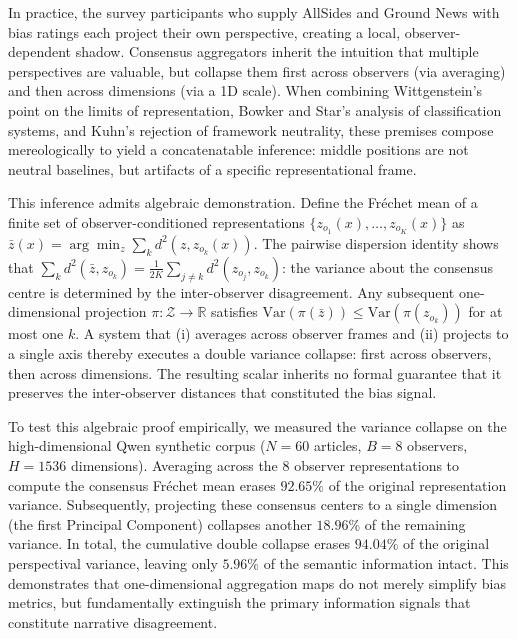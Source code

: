 In practice, the survey participants who supply AllSides and Ground News with bias ratings each project their own perspective, creating a local, observer-dependent shadow. Consensus aggregators inherit the intuition that multiple perspectives are valuable, but collapse them first across observers (via averaging) and then across dimensions (via a 1D scale). When combining Wittgenstein's \citeyearpar{wittgenstein1922} point on the limits of representation, Bowker and Star's \citeyearpar{bowkerstar1999} analysis of classification systems, and Kuhn's \citeyearpar{kuhn1962} rejection of framework neutrality, these premises compose mereologically to yield a concatenatable inference: middle positions are not neutral baselines, but artifacts of a specific representational frame.

This inference admits algebraic demonstration. Define the Fréchet mean of a finite set of observer-conditioned representations $\{z_{o_1}(x), \ldots, z_{o_K}(x)\}$ as $\bar{z}(x) = \arg\min_z \sum_{k} d^2(z, z_{o_k}(x))$. The pairwise dispersion identity shows that $\sum_k d^2(\bar{z}, z_{o_k}) = \frac{1}{2K}\sum_{j \neq k} d^2(z_{o_j}, z_{o_k})$: the variance about the consensus centre is determined by the inter-observer disagreement. Any subsequent one-dimensional projection $\pi\colon \mathcal{Z} \to \mathbb{R}$ satisfies $\mathrm{Var}(\pi(\bar{z})) \leq \mathrm{Var}(\pi(z_{o_k}))$ for at most one $k$. A system that (i) averages across observer frames and (ii) projects to a single axis thereby executes a double variance collapse: first across observers, then across dimensions. The resulting scalar inherits no formal guarantee that it preserves the inter-observer distances that constituted the bias signal.

To test this algebraic proof empirically, we measured the variance collapse on the high-dimensional Qwen synthetic corpus ($N=60$ articles, $B=8$ observers, $H=1536$ dimensions). Averaging across the 8 observer representations to compute the consensus Fréchet mean erases $92.65\%$ of the original representation variance. Subsequently, projecting these consensus centers to a single dimension (the first Principal Component) collapses another $18.96\%$ of the remaining variance. In total, the cumulative double collapse erases $94.04\%$ of the original perspectival variance, leaving only $5.96\%$ of the semantic information intact. This demonstrates that one-dimensional aggregation maps do not merely simplify bias metrics, but fundamentally extinguish the primary information signals that constitute narrative disagreement.

